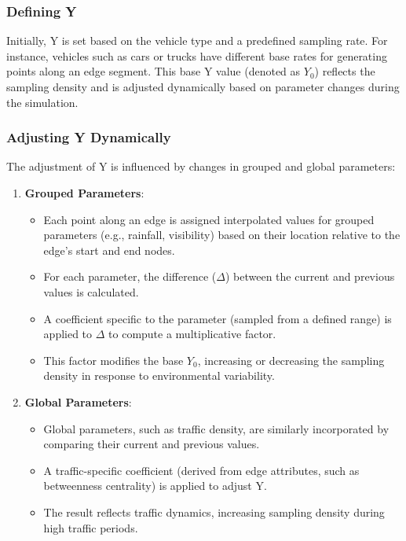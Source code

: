 \documentclass[sigplan,screen]{acmart}
\begin{document}
\subsubsection{Defining Y}
Initially, Y is set based on the vehicle type and a predefined sampling rate. For instance, vehicles such as cars or trucks have different base rates for generating points along an edge segment. This base Y value (denoted as $Y_0$) reflects the sampling density and is adjusted dynamically based on parameter changes during the simulation.

\subsubsection{Adjusting Y Dynamically}
The adjustment of Y is influenced by changes in grouped and global parameters:

\begin{enumerate}
    \item \textbf{Grouped Parameters}:
    \begin{itemize}
        \item Each point along an edge is assigned interpolated values for grouped parameters (e.g., rainfall, visibility) based on their location relative to the edge's start and end nodes.
        \item For each parameter, the difference ($\Delta$) between the current and previous values is calculated.
        \item A coefficient specific to the parameter (sampled from a defined range) is applied to $\Delta$ to compute a multiplicative factor.
        \item This factor modifies the base $Y_0$, increasing or decreasing the sampling density in response to environmental variability.
    \end{itemize}

    \item \textbf{Global Parameters}:
    \begin{itemize}
        \item Global parameters, such as traffic density, are similarly incorporated by comparing their current and previous values.
        \item A traffic-specific coefficient (derived from edge attributes, such as betweenness centrality) is applied to adjust Y.
        \item The result reflects traffic dynamics, increasing sampling density during high traffic periods.
    \end{itemize}
\end{enumerate}
\end{document}
